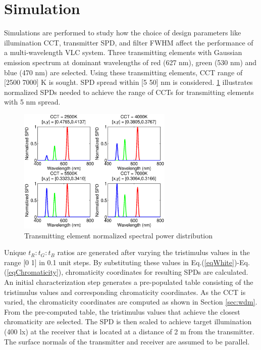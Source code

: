\section{Simulation}\label{sec:simulation}
Simulations are performed to study how the choice of design parameters like illumination CCT, transmitter SPD, and filter FWHM affect the performance of a multi-wavelength VLC system. Three transmitting elements with Gaussian emission spectrum at dominant wavelengths of red (627 nm), green (530 nm) and blue (470 nm) are selected. Using these transmitting elements, CCT range of [2500 7000] K is sought. SPD spread within [5 50] nm is considered. \figurename{\ref{fig:LEDSPD}} illustrates normalized SPDs needed to achieve the range of CCTs for transmitting elements with 5 nm spread.

\begin{figure}[!t]
	\centering
		\includegraphics[trim={0.05in 0.05in 0.05in 0.0in}, clip=true, width=2.9in]{img/LEDSPD.eps}
	\caption{Transmitting element normalized spectral power distribution}
	\label{fig:LEDSPD}
\end{figure}

Unique $t_R:t_G:t_B$ ratios are generated after varying the tristimulus values in the range [0 1] in 0.1 unit steps. By substituting these values in Eq.(\ref{eqWhite})-Eq.(\ref{eqChromaticity}), chromaticity coordinates for resulting SPDs are calculated. An initial characterization step generates a pre-populated table consisting of the tristimulus values and corresponding chromaticity coordinates. As the CCT is varied, the chromaticity coordinates are computed as shown in Section \ref{sec:wdm}. From the pre-computed table, the tristimulus values that achieve the closest chromaticity are selected. The SPD is then scaled to achieve target illumination (400 lx) at the receiver that is located at a distance of 2 m from the transmitter. The surface normals of the transmitter and receiver are assumed to be parallel.

